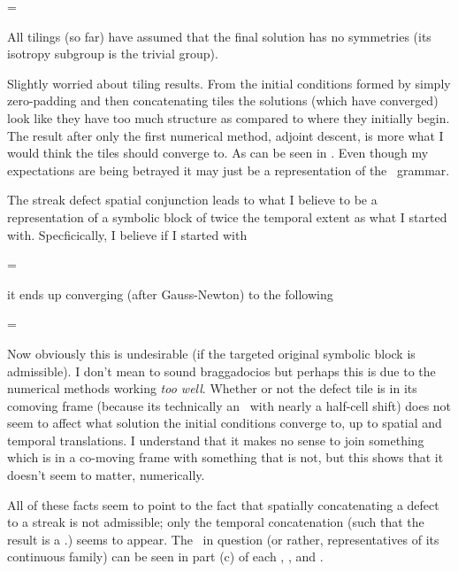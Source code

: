 \begin{description}
{\beq
\Mm=\left[\begin{array}{c}
0 1 2 \\
0 0 1
\end{array}\right]
\eeq


All tilings (so far)
have assumed that the final solution has
no symmetries (its isotropy subgroup is
the trivial group).

Slightly worried
about tiling results. From the initial
conditions formed by simply zero-padding
and then concatenating tiles the solutions
(which have converged) look like they have
too much structure as compared to where
they initially begin. The result after
only the first numerical method,
adjoint descent, is more what I would think
the tiles should converge to. As can
be seen in .
Even though my expectations are being betrayed
it may just be a representation of the \spt\ grammar.

The streak defect spatial conjunction leads to
what I believe to be a representation of
a symbolic block of twice the temporal
extent as what I started with.
Specficically, I believe if I started
with

\beq
\Mm=\left[\begin{array}{c}
0 1
\end{array}\right]
\eeq

it ends up converging (after Gauss-Newton)
to the following

\beq
\Mm=\left[\begin{array}{c}
0 1^* \\
0 1
\end{array}\right]
\eeq

Now obviously this is undesirable
(if the targeted original symbolic block
is admissible). I don't mean to sound braggadocios
but perhaps this is due to the numerical methods
working \textit{too well}. Whether or not
the defect tile is in its comoving frame (because
its technically an \rpo\ with nearly a half-cell shift)
does not seem to affect what solution the initial conditions
converge to, up to spatial and temporal translations. I understand
that it makes no sense to join something which is in a co-moving
frame with something that is not, but this shows that
it doesn't seem to matter, numerically.

All of these facts seem to point to the fact that spatially
concatenating a defect to a streak is not admissible; only
the temporal concatenation (such that the result is a \ppo.)
seems to appear. The \ppo\ in question (or rather, representatives
of its continuous family) can be seen in part (c) of each
,
, and .

}
\end{description}
